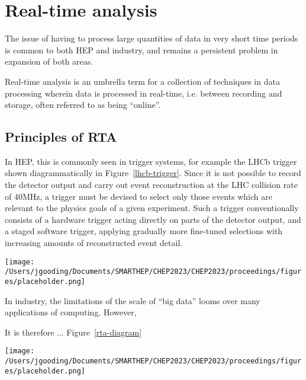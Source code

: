 \section{Real-time analysis}
\label{rta}
The issue of having to process large quantities of data in very short time periods is common to both HEP and industry, and remains a persistent problem in expansion of both areas. \cite{hu-big-data}\par
Real-time analysis is an umbrella term for a collection of techniques in data processing wherein data is processed in real-time, i.e. between recording and storage, often referred to as being ``online''.

\subsection{Principles of RTA}%
\label{common-problem}
In HEP, this is commonly seen in trigger systems, for example the LHCb trigger shown diagrammatically in Figure~\ref{lhcb-trigger}. Since it is not possible to record the detector output and carry out event reconstruction at the LHC collision rate of {40}{MHz}, a trigger must be devised to select only those events which are relevant to the physics goals of a given experiment. Such a trigger conventionally consists of a hardware trigger acting directly on parts of the detector output, and a staged software trigger, applying gradually more fine-tuned selections with increasing amounts of reconstructed event detail.\par
\begin{figure*}
    \centering
    \vspace*{5cm}       %
    \texttt{[image: /Users/jgooding/Documents/SMARTHEP/CHEP2023/CHEP2023/proceedings/figures/placeholder.png]}
    \caption{Trigger framework of the LHCb Experiment during Run 3 of the LHC. In Run 3, LHCb operates an entirely software-based trigger, processing events at the collision rate of {40}{MHz}. Additionally, calibration of the detector is carried out in real time.}
    \label{lhcb-trigger}       %
\end{figure*}
In industry, the limitations of the scale of ``big data'' looms over many applications of computing. However, \par
It is therefore ... Figure~\ref{rta-diagram}
\begin{figure*}
    \centering
    \vspace*{5cm}       %
    \texttt{[image: /Users/jgooding/Documents/SMARTHEP/CHEP2023/CHEP2023/proceedings/figures/placeholder.png]}
    \caption{Diagram demonstrating the real-time analysis approach to data processing.}
    \label{rta-diagram}       %
\end{figure*}



